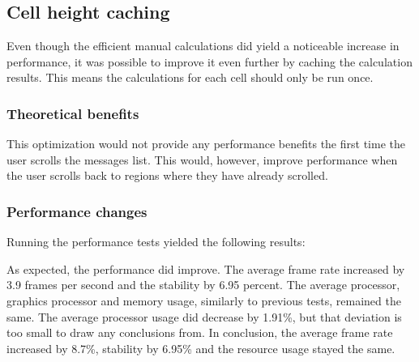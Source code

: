 \documentclass[a4paper,12pt]{article}
\begin{document}
\subsection{Cell height caching}
Even though the efficient manual calculations did yield a noticeable increase in performance, it was possible to improve it even further by caching the calculation results. This means the calculations for each cell should only be run once.

\subsubsection{Theoretical benefits}
This optimization would not provide any performance benefits the first time the user scrolls the messages list. This would, however, improve performance when the user scrolls back to regions where they have already scrolled.

\subsubsection{Performance changes}
Running the performance tests yielded the following results:

As expected, the performance did improve. The average frame rate increased by 3.9 frames per second and the stability by 6.95 percent. The average processor, graphics processor and memory usage, similarly to previous tests, remained the same. The average processor usage did decrease by 1.91\%, but that deviation is too small to draw any conclusions from. In conclusion, the average frame rate increased by 8.7\%, stability by 6.95\% and the resource usage stayed the same.
\end{document}
